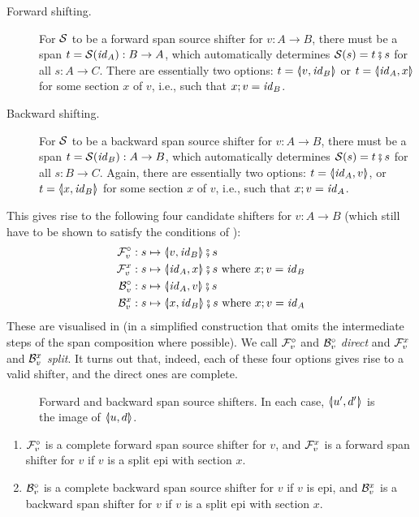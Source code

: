 \begin{description}
\item[Forward shifting.] For $\cS$ to be a forward span source shifter for $v:A\to B$, there must be a span $t=\cS(\id_A):B\to A$, which automatically determines $\cS(s)=t\spcomp s$ for all $s:A\to C$. There are essentially two options: $t=\spanof{v}{\id_B}$ or $t=\spanof{\id_A}{x}$ for some section $x$ of $v$, i.e., such that $x;v=\id_B$.

\item[Backward shifting.] For $\cS$ to be a backward span source shifter for $v:A\to B$, there must be a span $t=\cS(\id_B):A\to B$, which automatically determines $\cS(s)=t \spcomp s$ for all $s:B\to C$. Again, there are essentially two options: $t=\spanof{\id_A}{v}$, or $t=\spanof{x}{\id_B}$ for some section $x$ of $v$, i.e., such that $x;v=\id_A$.
\end{description}
%
This gives rise to the following four candidate shifters for $v:A\to B$ (which still have to be shown to satisfy the conditions of ):
%
\begin{align*}
\dF v & : s \mapsto \spanof{v}{\id_B}\spcomp s \\
\rF v x& : s \mapsto \spanof{\id_A}{x}\spcomp s \text{ where $x;v=\id_B$} \\
\dB v& : s \mapsto \spanof{\id_A}{v}\spcomp s \\
\rB v x& : s \mapsto \spanof{x}{\id_B}\spcomp s \text{ where $x;v=\id_A$}
\end{align*}
%
These are visualised in  (in a simplified construction that omits the intermediate steps of the span composition where possible). We call $\dF v$ and $\dB v$ \emph{direct} and $\rF v x$ and $\rB v x$ \emph{split}. It turns out that, indeed, each of these four options gives rise to a valid shifter, and the direct ones are complete.
%
\begin{figure}[t]
\centering

\caption{Forward and backward span source shifters. In each case, $\spanof{u'}{d'}$ is the image of $\spanof{u}{d}$.}
\end{figure}
%
\begin{proposition}
\begin{enumerate}[topsep=\smallskipamount]
\item $\cF_v^\circ$ is a complete forward span source shifter for $v$, and $\cF_v^x$ is a forward span shifter for $v$ if $v$ is a split epi with section $x$.
\item $\cB_v^\circ$ is a complete backward span source shifter for $v$ if $v$ is epi, and $\cB_v^x$ is a backward span shifter for $v$ if $v$ is a split epi with section $x$.
\end{enumerate}
\end{proposition}
